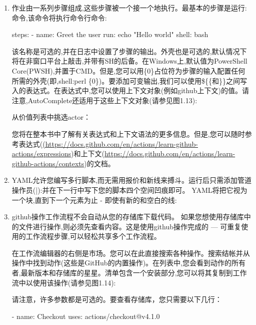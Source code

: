 \begin{enumerate}
\item 
作业由一系列步骤组成,这些步骤被一个接一个地执行。最基本的步骤是运行:命令,该命令将执行命令行命令:

\begin{shell}
steps:
  - name: Greet the user
    run: echo "Hello world"
    shell: bash
\end{shell}

该名称是可选的,并在日志中设置了步骤的输出。外壳也是可选的,默认情况下将在非窗口平台上敲击,并带有SH的后备。在Windows上,默认值为PowerShell Core(PWSH),并置于CMD。但是,您可以用\{0\}占位符为步骤的输入配置任何所需的外壳(即,shell:perl \{0\})。要添加可变输出,我们可以使用\$\{\{和\}\}之间写入的表达式。在表达式中,您可以使用上下文对象(例如github上下文)的值。请注意,AutoComplete还适用于这些上下文对象(请参见图1.13):


从价值列表中挑选actor：


您将在整本书中了解有关表达式和上下文语法的更多信息。但是,您可以随时参考表达式(\url{(https://docs.github.com/en/actions/learn-github-actions/expressions})和上下文(\url{https://docs.github.com/en/actions/learn-github-actions/contexts})的文档。

\item 
YAML允许您编写多行脚本,而无需用报价和新线来搏斗。运行后只需添加管道操作员(|):并在下一行中写下您的脚本四个空间凹痕即可。 YAML将把它视为一个块,直到下一个元素为止 - 即使有新的和空白的线:


\item 
github操作工作流程不会自动从您的存储库下载代码。 如果您想使用存储库中的文件进行操作,则必须先查看内容。这是使用github操作完成的 --- 可重复使用的工作流程步骤,可以轻松共享多个工作流程。

在工作流编辑器的右侧是市场。您可以在此直接搜索各种操作。搜索结帐并从操作中找到动作(这些是GitHub的内置操作)。在列表中,您会看到动作的所有者,最新版本和存储库的星星。清单包含一个安装部分,您可以将其复制到工作流中以使用该操作(请参见图1.14):


请注意，许多参数都是可选的。要查看存储库，您只需要以下几行：

\begin{shell}
- name: Checkout
  uses: actions/checkout@v4.1.0
\end{shell}


\end{enumerate}
